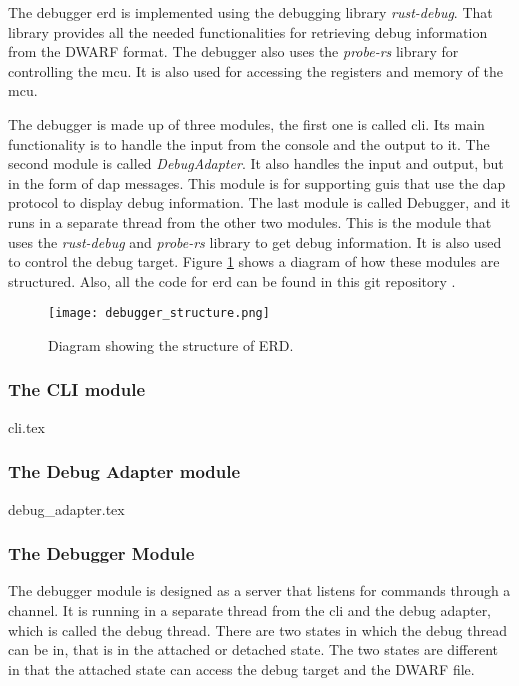 The debugger \acrfull{erd} is implemented using the debugging library \emph{rust-debug}.
That library provides all the needed functionalities for retrieving debug information from the \gls{DWARF} format.
The debugger also uses the \emph{probe-rs} library for controlling the \gls{mcu}.
It is also used for accessing the registers and memory of the \gls{mcu}.


The debugger is made up of three modules, the first one is called \acrshort{cli}.
Its main functionality is to handle the input from the console and the output to it.
The second module is called \emph{DebugAdapter}.
It also handles the input and output, but in the form of \gls{dap} messages.
This module is for supporting \glspl{gui} that use the \gls{dap} protocol to display debug information.
The last module is called Debugger, and it runs in a separate thread from the other two modules.
This is the module that uses the \emph{rust-debug} and \emph{probe-rs} library to get debug information.
It is also used to control the debug target.
Figure \ref{fig:ERDStruct} shows a diagram of how these modules are structured.
Also, all the code for \gls{erd} can be found in this git repository \cite{erd}.


\begin{figure}[h]
	\centering
	\texttt{[image: debugger\_structure.png]}
	\caption{Diagram showing the structure of ERD.}
	\label{fig:ERDStruct}
\end{figure}


\subsubsection{The CLI module}
{cli.tex}


\subsubsection{The Debug Adapter module}
{debug_adapter.tex}


\subsubsection{The Debugger Module}
The debugger module is designed as a server that listens for commands through a channel.
It is running in a separate thread from the \acrshort{cli} and the debug adapter, which is called the debug thread.
There are two states in which the debug thread can be in, that is in the attached or detached state.
The two states are different in that the attached state can access the debug target and the \gls{DWARF} file.


